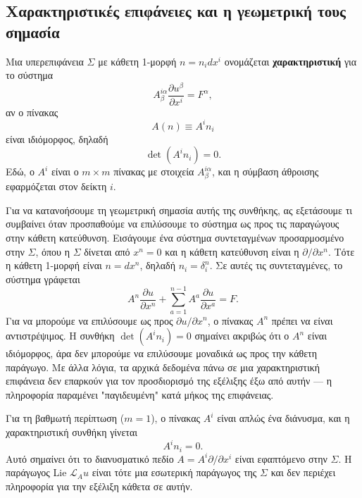 \documentclass[12pt]{article}
\begin{document}
\subsection{Χαρακτηριστικές επιφάνειες και η γεωμετρική τους σημασία}

Μια υπερεπιφάνεια $\Sigma$ με κάθετη 1-μορφή $n = n_i dx^i$ ονομάζεται \textbf{χαρακτηριστική} για το σύστημα
\[
A^{i \alpha}_\beta \frac{\partial u^\beta}{\partial x^i} = F^\alpha,
\]
αν ο πίνακας
\begin{equation}
A(n) \equiv A^{i} n_i
\end{equation}
είναι ιδιόμορφος, δηλαδή
\begin{equation}
\det(A^{i} n_i) = 0.
\end{equation}
Εδώ, ο $A^{i}$ είναι ο $m \times m$ πίνακας με στοιχεία $A^{i \alpha}_\beta$, και η σύμβαση άθροισης εφαρμόζεται στον δείκτη $i$.

Για να κατανοήσουμε τη γεωμετρική σημασία αυτής της συνθήκης, ας εξετάσουμε τι συμβαίνει όταν προσπαθούμε να επιλύσουμε το σύστημα ως προς τις παραγώγους στην κάθετη κατεύθυνση. Εισάγουμε ένα σύστημα συντεταγμένων προσαρμοσμένο στην $\Sigma$, όπου η $\Sigma$ δίνεται από $x^n = 0$ και η κάθετη κατεύθυνση είναι η $\partial / \partial x^n$. Τότε η κάθετη 1-μορφή είναι $n = dx^n$, δηλαδή $n_i = \delta^n_i$. Σε αυτές τις συντεταγμένες, το σύστημα γράφεται
\begin{equation}
A^{n} \frac{\partial u}{\partial x^n} + \sum_{a=1}^{n-1} A^{a} \frac{\partial u}{\partial x^a} = F.
\end{equation}
Για να μπορούμε να επιλύσουμε ως προς $\partial u / \partial x^n$, ο πίνακας $A^n$ πρέπει να είναι αντιστρέψιμος. Η συνθήκη $\det(A^{i} n_i) = 0$ σημαίνει ακριβώς ότι ο $A^n$ είναι ιδιόμορφος, άρα δεν μπορούμε να επιλύσουμε μοναδικά ως προς την κάθετη παράγωγο. Με άλλα λόγια, τα αρχικά δεδομένα πάνω σε μια χαρακτηριστική επιφάνεια δεν επαρκούν για τον προσδιορισμό της εξέλιξης έξω από αυτήν — η πληροφορία παραμένει "παγιδευμένη" κατά μήκος της επιφάνειας.

Για τη βαθμωτή περίπτωση ($m=1$), ο πίνακας $A^i$ είναι απλώς ένα διάνυσμα, και η χαρακτηριστική συνθήκη γίνεται
\begin{equation}
A^i n_i = 0.
\end{equation}
Αυτό σημαίνει ότι το διανυσματικό πεδίο $A = A^i \partial / \partial x^i$ είναι εφαπτόμενο στην $\Sigma$. Η παράγωγος Lie $\mathcal{L}_A u$ είναι τότε μια εσωτερική παράγωγος της $\Sigma$ και δεν περιέχει πληροφορία για την εξέλιξη κάθετα σε αυτήν.
\end{document}
